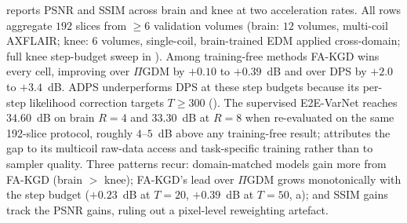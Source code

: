 \documentclass[10pt,twocolumn,letterpaper]{article}
\begin{document}
 reports PSNR and SSIM across brain and knee at two
acceleration rates. All rows aggregate $192$ slices from $\geq 6$ validation
volumes (brain: $12$ volumes, multi-coil AXFLAIR; knee: $6$ volumes,
single-coil, brain-trained EDM applied cross-domain; full knee step-budget
sweep in ). Among training-free methods FA-KGD wins
every cell, improving over $\Pi$GDM by $+0.10$ to $+0.39$~dB and over DPS by
$+2.0$ to $+3.4$~dB. ADPS underperforms DPS at
these step budgets because its per-step likelihood correction targets
$T\!\geq\!300$ ().
The supervised E2E-VarNet reaches $34.60$~dB on brain $R{=}4$ and
$33.30$~dB at $R{=}8$ when re-evaluated on the same 192-slice protocol,
roughly $4$--$5$~dB above any training-free result; 
attributes the gap to its multicoil raw-data access and task-specific
training rather than to sampler quality. Three patterns recur:
domain-matched models gain more from FA-KGD (brain $>$ knee); FA-KGD's
lead over $\Pi$GDM grows monotonically with the step budget
($+0.23$~dB at $T{=}20$, $+0.39$~dB at $T{=}50$, a);
and SSIM gains track the PSNR gains, ruling out a pixel-level
reweighting artefact.
\end{document}
